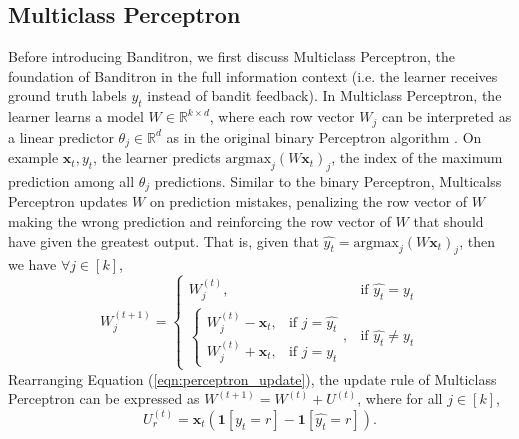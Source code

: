 \documentclass{article}
\begin{document}
\subsection{Multiclass Perceptron}
Before introducing Banditron, we first discuss Multiclass Perceptron, the foundation of Banditron in the full information context (i.e. the learner receives ground truth labels $y_t$ instead of bandit feedback). In Multiclass Perceptron, the learner learns a model $W\in\mathbb{R}^{k\times d}$, where each row vector $W_j$ can be interpreted as a linear predictor $\theta_j\in\mathbb{R}^d$ as in the original binary Perceptron algorithm \cite{rosenblatt1958perceptron}. On example $\mathbf{x}_t,y_t$, the learner predicts $\text{argmax}_j (W\mathbf{x}_t)_j$, the index of the maximum prediction among all $\theta_j$ predictions. Similar to the binary Perceptron, Multicalss Perceptron updates $W$ on prediction mistakes, penalizing the row vector of $W$ making the wrong prediction and reinforcing the row vector of $W$ that should have given the greatest output. That is, given that $\hat{y_t}=\text{argmax}_j (W\mathbf{x}_t)_j$, then we have $\forall j\in[k]$,
\begin{equation}\label{eqn:perceptron_update}
    W^{(t+1)}_j=
    \begin{cases}
        W^{(t)}_j,&\text{if } \hat{y_t}=y_t\\
        \begin{cases}
            W^{(t)}_j - \mathbf{x}_t, &\text{if } j=\hat{y_t}\\
            W^{(t)}_j + \mathbf{x}_t, &\text{if } j=y_t
        \end{cases},&\text{if } \hat{y_t}\neq y_t
    \end{cases}
\end{equation}
Rearranging Equation (\ref{eqn:perceptron_update}), the update rule of Multiclass Perceptron can be expressed as $W^{(t+1)}=W^{(t)}+U^{(t)}$, where for all $j\in[k]$, \begin{equation}\label{eqn:perceptron_u}U^{(t)}_r=\mathbf{x}_t(\mathbf{1}[y_t=r]-\mathbf{1}[\hat{y_t}=r]).\end{equation}
\end{document}
